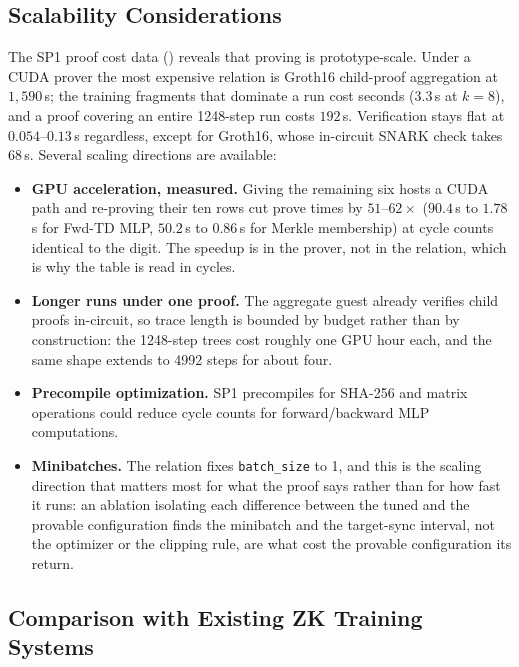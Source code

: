 \subsection{Scalability Considerations}

The SP1 proof cost data () reveals that proving is
prototype-scale. Under a CUDA prover the most expensive relation is Groth16
child-proof aggregation at $1{,}590$\,s; the training fragments that dominate a
run cost seconds ($3.3$\,s at $k\!=\!8$), and a proof covering an entire
1248-step run costs $192$\,s. Verification stays flat at $0.054$--$0.13$\,s
regardless, except for Groth16, whose in-circuit SNARK check takes $68$\,s.
Several scaling directions are available:

\begin{itemize}[leftmargin=1.5em]
  \item \textbf{GPU acceleration, measured.} Giving the remaining six hosts a
  CUDA path and re-proving their ten rows cut prove times by $51$--$62\times$
  ($90.4$\,s to $1.78$\,s for Fwd-TD MLP, $50.2$\,s to $0.86$\,s for Merkle
  membership) at cycle counts identical to the digit. The speedup is in the
  prover, not in the relation, which is why the table is read in cycles.
  \item \textbf{Longer runs under one proof.} The aggregate guest already
  verifies child proofs in-circuit, so trace length is bounded by budget rather
  than by construction: the 1248-step trees cost roughly one GPU hour each, and
  the same shape extends to 4992 steps for about four.
  \item \textbf{Precompile optimization.} SP1 precompiles for SHA-256 and
  matrix operations could reduce cycle counts for forward/backward MLP
  computations.
  \item \textbf{Minibatches.} The relation fixes \texttt{batch\_size} to 1,
  and this is the scaling direction that matters most for what the proof says
  rather than for how fast it runs: an ablation isolating each difference
  between the tuned and the provable configuration finds the minibatch and the
  target-sync interval, not the optimizer or the clipping rule, are what cost
  the provable configuration its return.
\end{itemize}

\subsection{Comparison with Existing ZK Training Systems}

